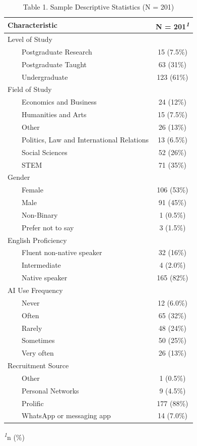 \documentclass[
]{article}
\begin{document}
\begin{table}[t]
\caption{\label{tab:unnamed-chunk-12}Table 1. Sample Descriptive Statistics (N = 201)} 
\fontsize{12.0pt}{14.0pt}\selectfont
\begin{tabular*}{\linewidth}{@{\extracolsep{\fill}}lc}
\toprule
\textbf{Characteristic} & \textbf{N = 201}\textsuperscript{\textit{1}} \\ 
\midrule\addlinespace[2.5pt]
Level of Study &  \\ 
    Postgraduate Research & 15 (7.5\%) \\ 
    Postgraduate Taught & 63 (31\%) \\ 
    Undergraduate & 123 (61\%) \\ 
Field of Study &  \\ 
    Economics and Business & 24 (12\%) \\ 
    Humanities and Arts & 15 (7.5\%) \\ 
    Other & 26 (13\%) \\ 
    Politics, Law and International Relations & 13 (6.5\%) \\ 
    Social Sciences & 52 (26\%) \\ 
    STEM & 71 (35\%) \\ 
Gender &  \\ 
    Female & 106 (53\%) \\ 
    Male & 91 (45\%) \\ 
    Non-Binary & 1 (0.5\%) \\ 
    Prefer not to say & 3 (1.5\%) \\ 
English Proficiency &  \\ 
    Fluent non-native speaker & 32 (16\%) \\ 
    Intermediate & 4 (2.0\%) \\ 
    Native speaker & 165 (82\%) \\ 
AI Use Frequency &  \\ 
    Never & 12 (6.0\%) \\ 
    Often & 65 (32\%) \\ 
    Rarely & 48 (24\%) \\ 
    Sometimes & 50 (25\%) \\ 
    Very often & 26 (13\%) \\ 
Recruitment Source &  \\ 
    Other & 1 (0.5\%) \\ 
    Personal Networks & 9 (4.5\%) \\ 
    Prolific & 177 (88\%) \\ 
    WhatsApp or messaging app & 14 (7.0\%) \\ 
\bottomrule
\end{tabular*}
\begin{minipage}{\linewidth}
\vspace{.05em}
\textsuperscript{\textit{1}}n (\%)\\
\end{minipage}
\end{table}
\end{document}
